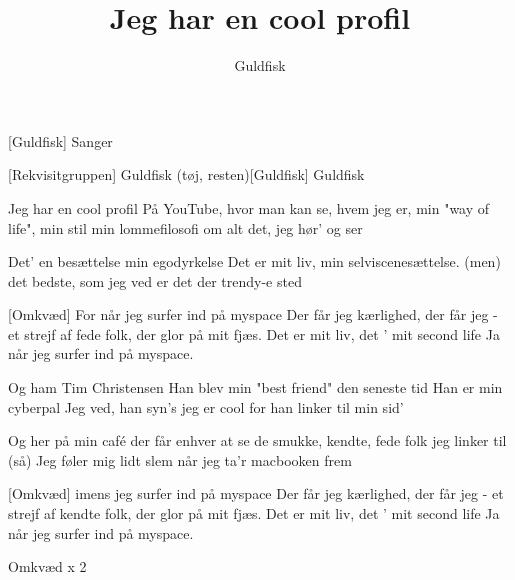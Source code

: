 \documentclass[a4paper,11pt]{article}
\title{Jeg har en cool profil}
\author{Guldfisk}
\begin{document}
\maketitle

\begin{roles}  
[Guldfisk] Sanger
\end{roles}

\begin{props}
[Rekvisitgruppen] Guldfisk
\prop(tøj, resten)[Guldfisk] Guldfisk

\end{props}

\begin{song}
   Jeg har en cool profil
På YouTube, hvor man kan se, hvem jeg er,
min "way of life", min stil
min lommefilosofi
om alt det, jeg hør' og ser

   Det' en besættelse
min egodyrkelse
Det er mit liv, min selviscenesættelse.
(men) det bedste, som jeg ved
er det der trendy-e sted

  [Omkvæd] For når jeg surfer ind på myspace
Der får jeg kærlighed, der får jeg - et strejf
af fede folk, der glor på mit fjæs.
Det er mit liv, det ' mit second life
Ja når jeg surfer ind på myspace.

   Og ham Tim Christensen
Han blev min "best friend" den seneste tid
Han er min cyberpal
Jeg ved, han syn's jeg er cool
for han linker til min sid'

   Og her på min café
der får enhver at se
de smukke, kendte, fede folk jeg linker til
(så) Jeg føler mig lidt slem
når jeg ta'r macbooken frem

  [Omkvæd] imens jeg surfer ind på myspace
Der får jeg kærlighed, der får jeg - et strejf
af kendte folk, der glor på mit fjæs.
Det er mit liv, det ' mit second life
Ja når jeg surfer ind på myspace.


 Omkvæd x 2
\end{song}
\end{document}
